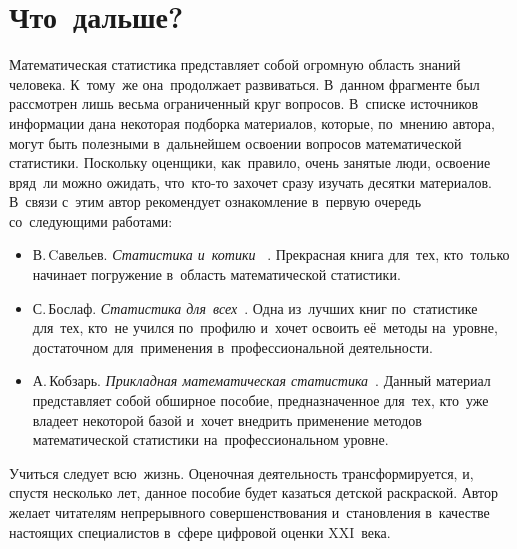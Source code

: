 \documentclass[]{scrartcl}
\begin{document}
\section{Что~дальше?}
Математическая статистика представляет собой огромную область знаний человека. К~тому~же она~продолжает развиваться. В~данном фрагменте был рассмотрен лишь весьма ограниченный круг вопросов. В~списке источников информации дана некоторая подборка материалов, которые, по~мнению автора, могут быть полезными в~дальнейшем освоении вопросов математической статистики. Поскольку оценщики, как~правило, очень занятые люди, освоение вряд~ли можно ожидать, что~кто-то захочет сразу изучать десятки материалов. В~связи с~этим автор рекомендует ознакомление в~первую очередь со~следующими работами:
	\begin{itemize}
		\item В.\,Cавельев. \emph{Статистика и~котики} ~\cite{Statistika-i-kotiki}. Прекрасная книга для~тех, кто~только начинает погружение в~область математической статистики.
		\item С.\,Бослаф. \emph{Статистика для~всех}~\cite{Statistika-dlya-vsex}. Одна из~лучших книг по~статистике для~тех, кто~не учился по~профилю и~хочет освоить её~методы на~уровне, достаточном для~применения в~профессиональной деятельности.
		\item А.\,Кобзарь. \emph{Прикладная математическая статистика}~\cite{Kobzarq-prikl-mathstat}. Данный материал представляет собой обширное пособие, предназначенное для~тех, кто~уже владеет некоторой базой и~хочет внедрить применение методов математической статистики на~профессиональном уровне.     
	\end{itemize}  

Учиться следует всю~жизнь. Оценочная деятельность трансформируется, и, спустя несколько лет, данное пособие будет казаться детской раскраской. Автор желает читателям непрерывного совершенствования и~становления в~качестве настоящих специалистов в~сфере цифровой оценки XXI~века.

\nocite{Statistika-i-kotiki, Xalqman:Regression-analiz, Baraz:KRA, GOST:Tochnostq-izmerenij-1, GOST:Statmetody, GOST:Statterminy, Stepik:osnovy-statistiki-1, Stepik:osnovy-statistiki-2, Stepik:osnovy-statistiki-3, Teorver-v-uduvolqstvie, CSC:la, CSC:teoriya-grafov, CSC:mathstat-1, CSC:diskt-math, CSC:matan-1, CSC:matan-2, CSC:teorver, CSC:vvedenie-v-matan, Statostika-dlya-gum, Stat-radiosignal, Sprav:mathstat, Math-mod-Kazanczeva, Statistika-dlya-vsex, Veroyatnosty-i-mathstat-Encz, Kobzarq-prikl-mathstat, N-hist, Stat-vyvody-i-svyazi, ITMO:statistika, Drejper-Smith:prikl-regr-analiz, Ajwazyan-prikl-stat, Shixalyyow-Regr-an-par-regr, Biznes-analiz-informaczii:statmetody}

\printbibliography[title=Источники информации]
\end{document}
